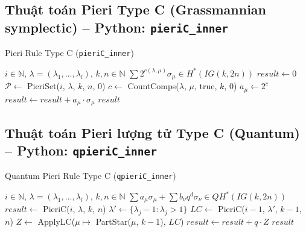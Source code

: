 

\subsection*{Thuật toán Pieri Type C (Grassmannian symplectic) -- Python: \texttt{pieriC\_inner}}

\begin{algorithm}[H]
\caption{Pieri Rule Type C (\texttt{pieriC\_inner})}
\begin{algorithmic}[1]
\REQUIRE $i \in \mathbb{N}$, $\lambda = (\lambda_1, ..., \lambda_l)$, $k, n \in \mathbb{N}$
\ENSURE $\sum 2^{c(\lambda,\mu)} \sigma_\mu \in H^*(IG(k,2n))$
\STATE $result \gets 0$
\STATE $\mathcal{P} \gets$ PieriSet($i$, $\lambda$, $k$, $n$, $0$)
    \STATE $c \gets$ CountComps($\lambda$, $\mu$, true, $k$, $0$)
    \STATE $a_\mu \gets 2^c$
    \STATE $result \gets result + a_\mu \cdot \sigma_\mu$
\ENDFOR
\RETURN $result$
\end{algorithmic}
\end{algorithm}

\subsection*{Thuật toán Pieri lượng tử Type C (Quantum) -- Python: \texttt{qpieriC\_inner}}

\begin{algorithm}[H]
\caption{Quantum Pieri Rule Type C (\texttt{qpieriC\_inner})}
\begin{algorithmic}[1]
\REQUIRE $i \in \mathbb{N}$, $\lambda = (\lambda_1, ..., \lambda_l)$, $k, n \in \mathbb{N}$
\ENSURE $\sum a_\mu \sigma_\mu + \sum b_\nu q^d \sigma_\nu \in QH^*(IG(k,2n))$
\STATE $result \gets$ PieriC($i$, $\lambda$, $k$, $n$) 
    \STATE $\lambda' \gets \{\lambda_j - 1 : \lambda_j > 1\}$
    \STATE $LC \gets$ PieriC($i-1$, $\lambda'$, $k-1$, $n$)
    \STATE $Z \gets$ ApplyLC($\mu \mapsto$ PartStar($\mu$, $k-1$), $LC$)
    \STATE $result \gets result + q \cdot Z$
\ENDIF
\RETURN $result$
\end{algorithmic}
\end{algorithm}

